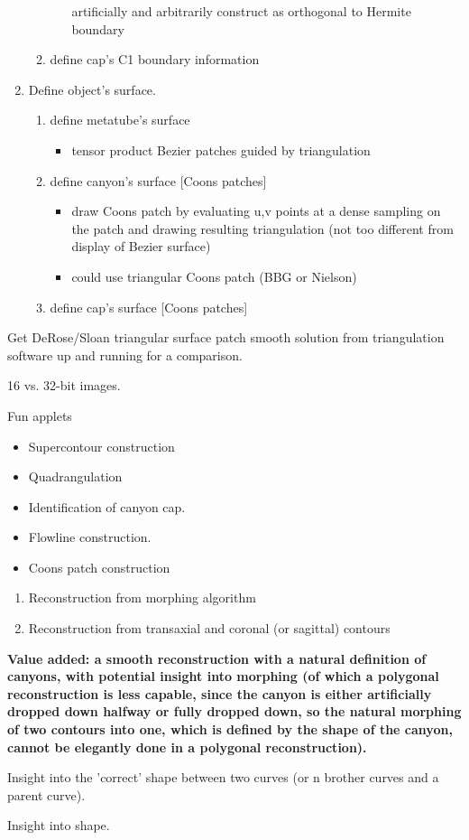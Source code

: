 \documentclass[11pt,titlepage]{article}
\begin{document}
\begin{enumerate}
\begin{enumerate}
\begin{itemize}
	artificially and arbitrarily construct as orthogonal to Hermite boundary
\end{itemize}
\item define cap's C1 boundary information
\end{enumerate}
\item Define object's surface.
\begin{enumerate}
\item define metatube's surface
\begin{itemize}
\item tensor product Bezier patches guided by triangulation
\end{itemize}
\item define canyon's surface [Coons patches]
\begin{itemize}
\item draw Coons patch by evaluating u,v points at a dense sampling on the patch
	and drawing resulting triangulation (not too different from 
	display of Bezier surface)
\item could use triangular Coons patch (BBG or Nielson)
\end{itemize}
\item define cap's surface [Coons patches]
\end{enumerate}
\end{enumerate}

Get DeRose/Sloan triangular surface patch smooth solution from triangulation
software up and running for a comparison.

16 vs. 32-bit images.

Fun applets
\begin{itemize}
\item Supercontour construction
\item Quadrangulation
\item Identification of canyon cap.
\item Flowline construction.
\item Coons patch construction
\end{itemize}

\begin{enumerate}
\item Reconstruction from morphing algorithm
\item Reconstruction from transaxial and coronal (or sagittal) contours
\end{enumerate}

{\bf Value added: a smooth reconstruction with a natural definition of
	canyons, with potential insight into morphing (of which a polygonal
	reconstruction is less capable, since the canyon is either artificially
	dropped down halfway or fully dropped down, so the natural
	morphing of two contours into one, which is defined by the shape
	of the canyon, cannot be elegantly done in a polygonal reconstruction).
	
	Insight into the 'correct' shape between two curves (or n brother curves
	and a parent curve).
	
	Insight into shape.
}
\end{document}
